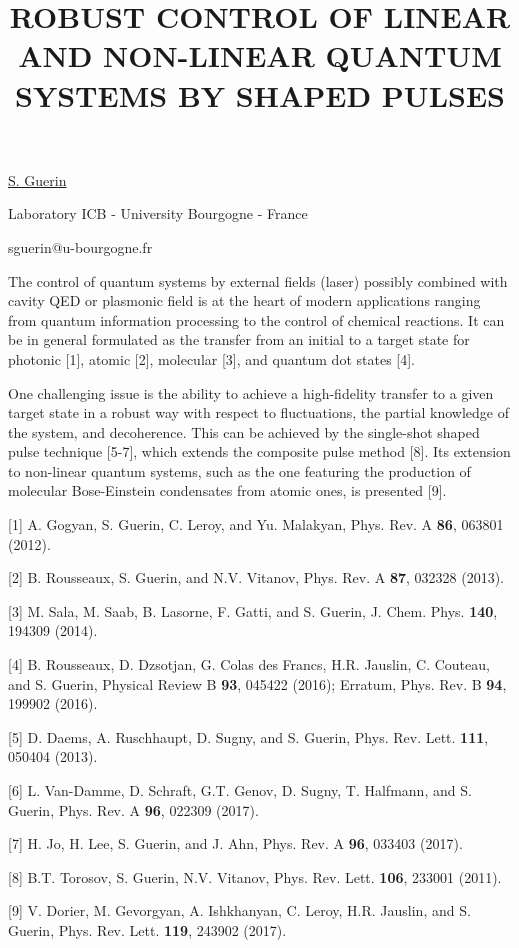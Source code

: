 \title{ROBUST CONTROL OF LINEAR AND NON-LINEAR QUANTUM SYSTEMS BY SHAPED PULSES}

\underline{S. Guerin} 

{\normalsize{\vspace{-4mm}
Laboratory ICB - University Bourgogne - France



\email sguerin@u-bourgogne.fr}}

The control of quantum systems by external fields (laser) possibly combined with cavity QED or plasmonic field is at the heart of modern applications ranging from quantum information processing to the control of chemical reactions.  It can be in general formulated as the transfer from an initial to a target state for photonic [1], atomic [2], molecular [3], and quantum dot states [4].

One challenging issue is the ability to achieve a high-fidelity transfer to a given target state in a robust way with respect to fluctuations, the partial knowledge of the system, and decoherence. This can be achieved by the single-shot shaped pulse technique [5-7], which extends the composite pulse method [8]. Its extension to non-linear quantum systems, such as the one featuring the production of molecular Bose-Einstein condensates from atomic ones, is presented [9].

{\normalsize
[1] A. Gogyan, S. Guerin, C. Leroy, and Yu. Malakyan, Phys. Rev. A \textbf{86}, 063801 (2012).
\vsp

[2] B. Rousseaux, S. Guerin, and N.V. Vitanov, Phys. Rev. A \textbf{87}, 032328 (2013).
\vsp

[3] M. Sala,  M. Saab, B. Lasorne, F. Gatti, and S. Guerin, J. Chem. Phys. \textbf{140}, 194309 (2014).
\vsp

[4] B. Rousseaux, D. Dzsotjan, G. Colas des Francs, H.R. Jauslin, C. Couteau, and S. Guerin, Physical Review B \textbf{93}, 045422 (2016); Erratum, Phys. Rev. B \textbf{94}, 199902 (2016).
\vsp

[5] D. Daems, A. Ruschhaupt, D. Sugny, and S. Guerin, Phys. Rev. Lett. \textbf{111}, 050404 (2013).
\vsp

[6] L. Van-Damme, D. Schraft, G.T. Genov, D. Sugny, T. Halfmann, and S. Guerin, Phys. Rev. A \textbf{96}, 022309 (2017).
\vsp

[7] H. Jo, H. Lee, S. Guerin, and J. Ahn, Phys. Rev. A \textbf{96}, 033403 (2017).
\vsp

[8] B.T. Torosov, S. Guerin, N.V. Vitanov, Phys. Rev. Lett. \textbf{106}, 233001 (2011).
\vsp

[9] V. Dorier, M. Gevorgyan, A. Ishkhanyan, C. Leroy, H.R. Jauslin, and S. Guerin, Phys. Rev. Lett. \textbf{119}, 243902 (2017).
}

\vspace{\baselineskip} 